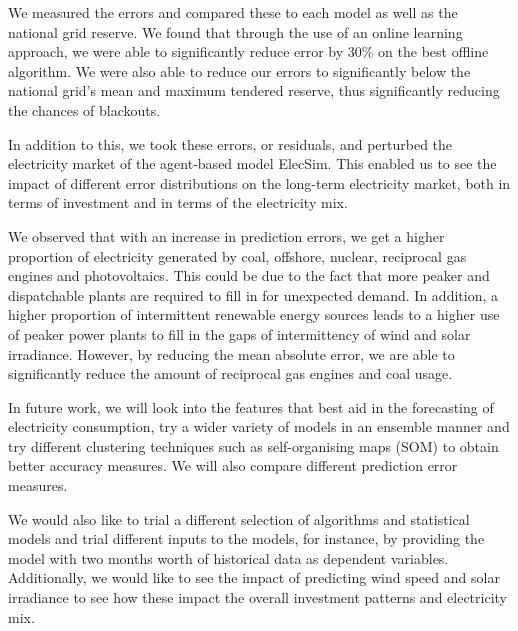We measured the errors and compared these to each model as well as the national grid reserve. We found that through the use of an online learning approach, we were able to significantly reduce error by 30\% on the best offline algorithm.  We were also able to reduce our errors to significantly below the national grid's mean and maximum tendered reserve, thus significantly reducing the chances of blackouts.

In addition to this, we took these errors, or residuals, and perturbed the electricity market of the agent-based model ElecSim. This enabled us to see the impact of different error distributions on the long-term electricity market, both in terms of investment and in terms of the electricity mix.

We observed that with an increase in prediction errors, we get a higher proportion of electricity generated by coal, offshore, nuclear, reciprocal gas engines and photovoltaics. This could be due to the fact that more peaker and dispatchable plants are required to fill in for unexpected demand. In addition, a higher proportion of intermittent renewable energy sources leads to a higher use of peaker power plants to fill in the gaps of intermittency of wind and solar irradiance. However, by reducing the mean absolute error, we are able to significantly reduce the amount of reciprocal gas engines and coal usage.


In future work, we will look into the features that best aid in the forecasting of electricity consumption, try a wider variety of models in an ensemble manner and try different clustering techniques such as self-organising maps (SOM) to obtain better accuracy measures. We will also compare different prediction error measures. 

We would also like to trial a different selection of algorithms and statistical models and trial different inputs to the models, for instance, by providing the model with two months worth of historical data as dependent variables. Additionally, we would like to see the impact of predicting wind speed and solar irradiance to see how these impact the overall investment patterns and electricity mix. 























